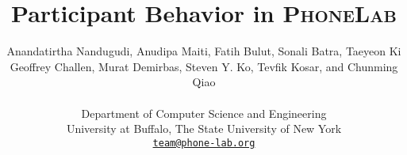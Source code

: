 \documentclass[10pt,twocolumn]{article}
\begin{document}
\date{}

\title{Participant Behavior in \textsc{PhoneLab}}

\author{
Anandatirtha Nandugudi, Anudipa Maiti, Fatih Bulut, Sonali Batra, Taeyeon Ki\\
Geoffrey Challen, Murat Demirbas, Steven Y. Ko, Tevfik Kosar, and Chunming
Qiao\\
\\
Department of Computer Science and Engineering\\
University at Buffalo, The State University of New York\\
\href{mailto:team@phone-lab.org}{\nolinkurl{team@phone-lab.org}}
}

\maketitle

\pagestyle{empty}





{\footnotesize 
}
\end{document}
